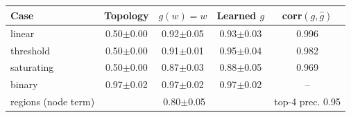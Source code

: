 \begin{tabular}{lcccc}\toprule
Case & Topology & $g(w)=w$ & Learned $g$ & corr$(g,\hat g)$ \\\midrule
linear & 0.50$\pm$0.00 & 0.92$\pm$0.05 & 0.93$\pm$0.03 & 0.996 \\
threshold & 0.50$\pm$0.00 & 0.91$\pm$0.01 & 0.95$\pm$0.04 & 0.982 \\
saturating & 0.50$\pm$0.00 & 0.87$\pm$0.03 & 0.88$\pm$0.05 & 0.969 \\
binary & 0.97$\pm$0.02 & 0.97$\pm$0.02 & 0.97$\pm$0.02 & -- \\
regions (node term) & \multicolumn{3}{c}{0.80$\pm$0.05} & top-4 prec. 0.95 \\
\bottomrule\end{tabular}
